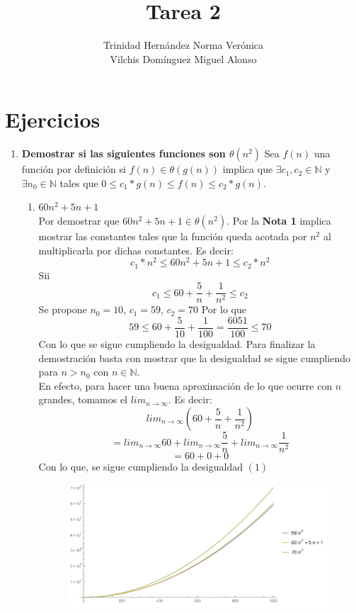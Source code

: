 \documentclass[11 pt, a4paper]{article}
\author{Trinidad Hern\'andez Norma Ver\'onica \\
        Vilchis Dom\'inguez Miguel Alonso}
\title{Tarea 2}
\date{}
\theoremstyle{definition}
\begin{document}
\maketitle

\section{Ejercicios}

\begin{enumerate}
 \item \textbf{Demostrar si las siguientes funciones son $\theta(n^2)$}
 \no Sea $f(n)$ una función por definición si $f(n) \in \theta(g(n))$ 
 implica que $ \exists c_1, c_2 \in \mathbb{N} $ y $\exists n_0 \in \mathbb{N}$ 
 tales que $0 \leq c_1*g(n) \leq f(n) \leq c_2*g(n)$.
 \begin{enumerate}
  \item $60n^2 + 5n +1$\\
  Por demostrar que $60n^2 + 5n +1 \in \theta(n^2)$. Por la \textbf{Nota 1}
  implica mostrar las constantes tales que la función queda acotada por 
  $n^2$ al multiplicarla por dichas constantes. Es decir:\\
  \begin{equation} 
   c_1* n^2 \leq 60n^2 + 5n +1 \leq c_2 * n^2 
   \end{equation}
  Sii
  \[ c_1 \leq 60 + \frac{5}{n} + \frac{1}{n^2} \leq c_2 \]
  Se propone $n_0 = 10$, $c_1 = 59$, $c_2 = 70$  Por lo que
  \[ 59 \leq 60 + \frac{5}{10} + \frac{1}{100} = \frac{6051}{100} \leq 70  \]
  Con lo que se sigue cumpliendo la desigualdad. Para finalizar la demostración 
  basta con mostrar que la desigualdad se sigue cumpliendo para
  $n > n_0$ con $n \in \mathbb{N}$.\\ 
  En efecto, para hacer una buena aproximación de lo que ocurre con 
  $n$ grandes, tomamos el $lim_{n \rightarrow \infty}$. Es decir:
  \[ lim_{n \rightarrow \infty} \left(60 + \frac{5}{n} + \frac{1}{n^2} \right)\]
   \[  = lim_{n \rightarrow \infty} 60 + lim_{n \rightarrow \infty} \frac{5}{n} + lim_{n \rightarrow \infty} \frac{1}{n^2} \]
  \[  = 60 + 0+0 \]
  Con lo que, se sigue cumpliendo la desigualdad $(1)$
  \begin{figure}[H]
         \centering
          \includegraphics[trim=0cm 0cm 0cm 0cm, width=15cm]{inciso1.png} 

\end{figure}
\end{enumerate}
\end{enumerate}
\end{document}
